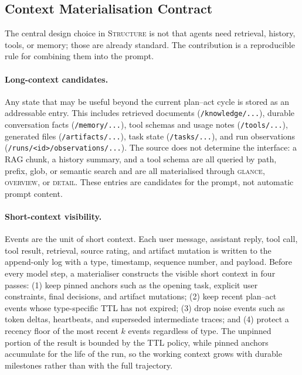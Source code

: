 
\subsection{Context Materialisation Contract}
\label{sec:long_short_context}

The central design choice in \textsc{Structure} is not that agents need
retrieval, history, tools, or memory; those are already standard. The
contribution is a reproducible rule for combining them into the prompt.

\paragraph{Long-context candidates.}
Any state that may be useful beyond the current plan--act cycle is
stored as an addressable entry. This includes retrieved documents
(\texttt{/knowledge/...}), durable conversation facts
(\texttt{/memory/...}), tool schemas and usage notes
(\texttt{/tools/...}), generated files (\texttt{/artifacts/...}), task
state (\texttt{/tasks/...}), and run observations
(\texttt{/runs/<id>/observations/...}). The source does not determine
the interface: a RAG chunk, a history summary, and a tool schema are
all queried by path, prefix, glob, or semantic search and are all
materialised through \textsc{glance}, \textsc{overview}, or
\textsc{detail}. These entries are candidates for the prompt, not
automatic prompt content.

\paragraph{Short-context visibility.}
Events are the unit of short context. Each user message, assistant
reply, tool call, tool result, retrieval, source rating, and artifact
mutation is written to the append-only log with
a type, timestamp, sequence number, and payload. Before every model
step, a materialiser constructs the visible short context in four
passes: (1) keep pinned anchors such as the opening task, explicit user
constraints, final decisions, and artifact mutations; (2) keep recent
plan--act events whose type-specific TTL has not expired; (3) drop
noise events such as token deltas, heartbeats, and superseded
intermediate traces; and (4) protect a recency floor of the most
recent $k$ events regardless of type. The unpinned portion of the
result is bounded by the TTL policy, while pinned anchors accumulate
for the life of the run, so the working context grows with durable
milestones rather than with the full trajectory.

